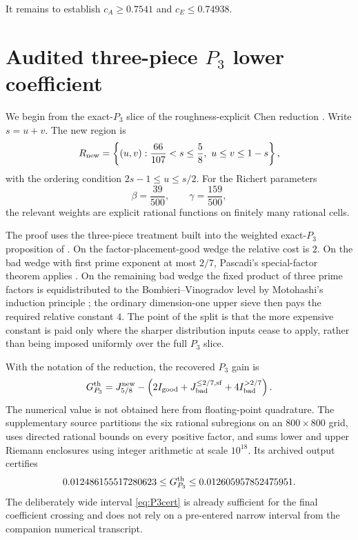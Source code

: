 \documentclass{aomart}
\theoremstyle{definition}
\newcommand{\1}{\mathbf 1}
\begin{document}
It remains to establish $c_A\ge0.7541$ and $c_E\le0.74938$.

\section{Audited three-piece $P_3$ lower coefficient}\label{sec:lower}

We begin from the exact-$P_3$ slice of the roughness-explicit Chen reduction \cite{RatliffRough2026}.  Write $s=u+v$.  The new region is
\begin{equation}\label{eq:Rnew}
 R_{\rm new}=\left\{(u,v):\frac{66}{107}<s\le\frac58,\ u\le v\le1-s\right\},
\end{equation}
with the ordering condition $2s-1\le u\le s/2$.  For the Richert parameters
\[
 \beta=\frac{39}{500},\qquad \gamma=\frac{159}{500},
\]
the relevant weights are explicit rational functions on finitely many rational cells.

The proof uses the three-piece treatment built into the weighted exact-$P_3$ proposition of \cite{RatliffRough2026}.  On the factor-placement-good wedge the relative cost is $2$.  On the bad wedge with first prime exponent at most $2/7$, Pascadi's special-factor theorem applies \cite{Pascadi2025}.  On the remaining bad wedge the fixed product of three prime factors is equidistributed to the Bombieri--Vinogradov level by Motohashi's induction principle \cite{Motohashi1976}; the ordinary dimension-one upper sieve then pays the required relative constant $4$.  The point of the split is that the more expensive constant is paid only where the sharper distribution inputs cease to apply, rather than being imposed uniformly over the full $P_3$ slice.

With the notation of the reduction, the recovered $P_3$ gain is
\begin{equation}\label{eq:P3decomp}
 G_{P_3}^{\rm th}=J_{5/8}^{\rm new}
 -\left(2I_{\rm good}+J_{\rm bad}^{\le2/7,{\rm sf}}+4I_{\rm bad}^{>2/7}\right).
\end{equation}
The numerical value is not obtained here from floating-point quadrature.  The supplementary source  partitions the six rational subregions on an $800\times800$ grid, uses directed rational bounds on every positive factor, and sums lower and upper Riemann enclosures using integer arithmetic at scale $10^{18}$.  Its archived output certifies
\begin{equation}\label{eq:P3cert}
 0.012486155517280623
 \le G_{P_3}^{\rm th}
 \le0.012605957852475951.
\end{equation}
The deliberately wide interval \eqref{eq:P3cert} is already sufficient for the final coefficient crossing and does not rely on a pre-entered narrow interval from the companion numerical transcript.
\end{document}
